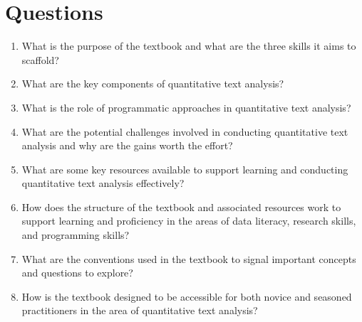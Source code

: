 \documentclass[
  letterpaper,
]{scrbook}
\providecommand{\tightlist}{%
  \setlength{\itemsep}{0pt}\setlength{\parskip}{0pt}}\usepackage{longtable,booktabs,array}
\begin{document}
\hypertarget{questions}{%
\section*{Questions}\label{questions}}


\begin{tcolorbox}[enhanced jigsaw, title=\textcolor{quarto-callout-note-color}{\faInfo}\hspace{0.5em}{Conceptual questions}, titlerule=0mm, toptitle=1mm, colbacktitle=quarto-callout-note-color!10!white, bottomtitle=1mm, left=2mm, colframe=quarto-callout-note-color-frame, breakable, toprule=.15mm, colback=white, opacitybacktitle=0.6, leftrule=.75mm, rightrule=.15mm, bottomrule=.15mm, arc=.35mm, coltitle=black, opacityback=0]

\begin{enumerate}
\def\labelenumi{\arabic{enumi}.}
\tightlist
\item
  What is the purpose of the textbook and what are the three skills it
  aims to scaffold?
\item
  What are the key components of quantitative text analysis?
\item
  What is the role of programmatic approaches in quantitative text
  analysis?
\item
  What are the potential challenges involved in conducting quantitative
  text analysis and why are the gains worth the effort?
\item
  What are some key resources available to support learning and
  conducting quantitative text analysis effectively?
\item
  How does the structure of the textbook and associated resources work
  to support learning and proficiency in the areas of data literacy,
  research skills, and programming skills?
\item
  What are the conventions used in the textbook to signal important
  concepts and questions to explore?
\item
  How is the textbook designed to be accessible for both novice and
  seasoned practitioners in the area of quantitative text analysis?
\end{enumerate}

\end{tcolorbox}
\end{document}
